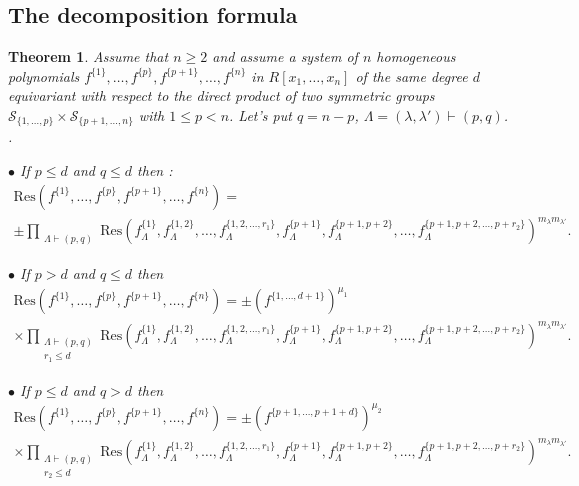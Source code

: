 \documentclass[12pt,a4paper,reqno]{amsart}
\newtheorem{theorem}{Theorem}[section]
\theoremstyle{definition}
\theoremstyle{remark}
\numberwithin{equation}{section}
\newcommand{\Res}{\mathrm{Res}}
\begin{document}
\subsection{The decomposition formula}

\begin{theorem}\label{thm:maintheorem} Assume that $n\geq 2$ and  assume a system of $n$ homogeneous polynomials $f^{\{1\}},\ldots, f^{\{p\}}, f^{\{p+1\}},\ldots, f^{\{n\}}$ in $R[x_1,\ldots,x_n]$ of the same degree $d$ equivariant with respect to the direct product of two symmetric groups  $\mathcal{S}_{\{1
,\ldots,p\}}\times\mathcal{S}_{\{p+1
,\ldots,n\}} $ with $1\leq p<n$. Let's put $q=n-p$, $\Lambda=(\lambda, \lambda')\vdash (p, q)$. 
. 

\noindent $\bullet$ If $p\leq d$ and $q\leq d$ then :
\begin{multline*}
\Res\left(f^{\{1\}},\ldots,f^{\{p\}},f^{\{p+1\}},\ldots,f^{\{n\}}\right)=\\ \pm
 \prod_{\substack{\Lambda\vdash (p,q)}}
\Res\left( f_{\Lambda}^{\{1\}}, f_{\Lambda}^{\{1,2\}}, \ldots, f_{\Lambda}^{\{1,2,\ldots,r_1\}},f_{\Lambda}^{\{p+1\}}, f_{\Lambda}^{\{p+1,p+2\}}, \ldots, f_{\Lambda}^{\{p+1,p+2,\ldots,p+r_2\}} 
\right)^{m_{\lambda}m_{\lambda'}}.
\end{multline*}


\noindent $\bullet$ If $p> d$ and $q\leq d$ then
\begin{multline*}
\Res\left(f^{\{1\}},\ldots,f^{\{p\}},f^{\{p+1\}},\ldots,f^{\{n\}}\right)=
 \pm \left(f^{\{1,\ldots,d+1\}}\right)^{\mu_1}\\ \times\prod_{\substack{\Lambda\vdash (p,q)\\ r_1\leq d}}
\Res\left( f_{\Lambda}^{\{1\}}, f_{\Lambda}^{\{1,2\}}, \ldots, f_{\Lambda}^{\{1,2,\ldots,r_1\}},f_{\Lambda}^{\{p+1\}}, f_{\Lambda}^{\{p+1,p+2\}}, \ldots, f_{\Lambda}^{\{p+1,p+2,\ldots,p+r_2\}} 
\right)^{m_{\lambda}m_{\lambda'}}.
\end{multline*}


\noindent $\bullet$ If $p\leq d$ and $q> d$ then
\begin{multline*}
\Res\left(f^{\{1\}},\ldots,f^{\{p\}},f^{\{p+1\}},\ldots,f^{\{n\}}\right)=
 \pm \left(f^{\{p+1,\ldots,p+1+d\}}\right)^{\mu_2}\\ \times\prod_{\substack{\Lambda\vdash (p,q)\\ r_2\leq d}}
\Res\left( f_{\Lambda}^{\{1\}}, f_{\Lambda}^{\{1,2\}}, \ldots, f_{\Lambda}^{\{1,2,\ldots,r_1\}},f_{\Lambda}^{\{p+1\}}, f_{\Lambda}^{\{p+1,p+2\}}, \ldots, f_{\Lambda}^{\{p+1,p+2,\ldots,p+r_2\}} 
\right)^{m_{\lambda}m_{\lambda'}}.
\end{multline*}


\end{theorem}
\end{document}

